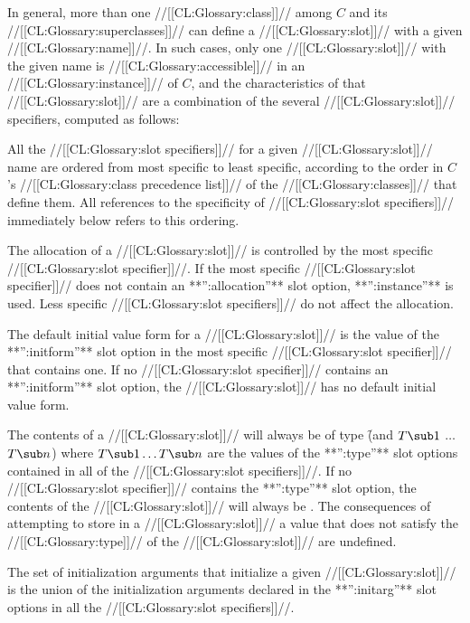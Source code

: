 In general, more than one //[[CL:Glossary:class]]// among $C$ and its 
//[[CL:Glossary:superclasses]]// can
define a //[[CL:Glossary:slot]]// with a given //[[CL:Glossary:name]]//.  
In such cases, only one //[[CL:Glossary:slot]]// with
the given name is //[[CL:Glossary:accessible]]// in an //[[CL:Glossary:instance]]// 
of $C$\negthinspace, and
the characteristics of that //[[CL:Glossary:slot]]// are 
a combination of the several //[[CL:Glossary:slot]]//
specifiers, computed as follows:

\beginlist

\itemitem{\bull} All the //[[CL:Glossary:slot specifiers]]// for a given //[[CL:Glossary:slot]]// name
are ordered from most specific to least specific, according to the order in $C$'s
//[[CL:Glossary:class precedence list]]// of the //[[CL:Glossary:classes]]// that define them. All references
to the specificity of //[[CL:Glossary:slot specifiers]]// immediately below refers to this
ordering.

\itemitem{\bull} The allocation of a //[[CL:Glossary:slot]]// is controlled by the most 
specific //[[CL:Glossary:slot specifier]]//.  If the most specific //[[CL:Glossary:slot specifier]]// 
does not contain an **'':allocation''** slot option, **'':instance''** is used.
Less specific //[[CL:Glossary:slot specifiers]]// do not affect the allocation.

\itemitem{\bull} The default initial value form for a //[[CL:Glossary:slot]]// 
is the value of the **'':initform''** slot option in the most specific
//[[CL:Glossary:slot specifier]]// that contains one.  If no //[[CL:Glossary:slot specifier]]//
contains an **'':initform''** slot option, the //[[CL:Glossary:slot]]// 
has no default initial value form.

\itemitem{\bull} The contents of a //[[CL:Glossary:slot]]// will always be of type 
\f{(and $T\sub 1$ $\ldots$ $T\sub n$)} where $T\sub 1 \ldots T\sub n$ are
the values of the **'':type''** slot options contained in all of the
//[[CL:Glossary:slot specifiers]]//.  If no //[[CL:Glossary:slot specifier]]// contains the
**'':type''** slot option, the contents of the //[[CL:Glossary:slot]]// will always be 
. The consequences of attempting to store in a //[[CL:Glossary:slot]]//
a value that does not satisfy the //[[CL:Glossary:type]]// of the //[[CL:Glossary:slot]]// are undefined.

\itemitem{\bull} The set of initialization arguments that initialize a 
given //[[CL:Glossary:slot]]// is the union of the initialization arguments declared in
the **'':initarg''** slot options in all the //[[CL:Glossary:slot specifiers]]//.

